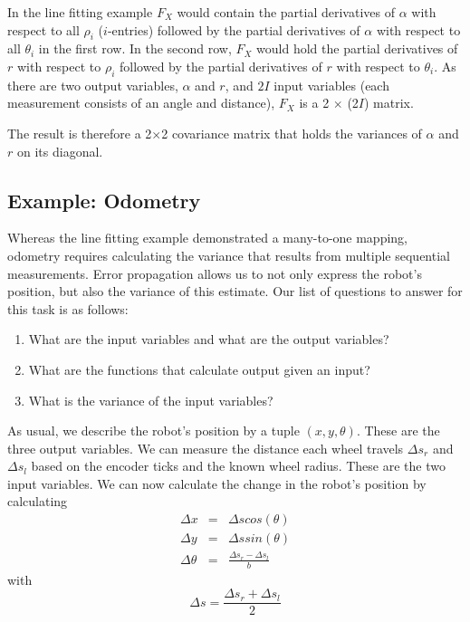 In the line fitting example $ F_X$ would contain the partial derivatives of $ \alpha$ with respect to all $ \rho_i$ ($i$-entries) followed by the partial derivatives of $ \alpha$ with respect to all $ \theta_i$ in the first row. In the second row, $ F_X$ would hold the partial derivatives of $ r$ with respect to $ \rho_i$ followed by the partial derivatives of $ r$ with respect to $ \theta_i$. As there are two output variables, $ \alpha$ and $ r$, and $2I$ input variables (each measurement consists of an angle and distance), $ F_X$ is a 2 $\times$ (2$I$) matrix.

The result is therefore a 2$\times$2 covariance matrix that holds the variances of $ \alpha$ and $ r$ on its diagonal.

\subsection{Example: Odometry}
Whereas the line fitting example demonstrated a many-to-one mapping, odometry requires calculating the variance that results from multiple sequential measurements.  Error propagation allows us to not only express the robot's position, but also the variance of this estimate. Our list of questions to answer for this task is as follows:
\begin{enumerate}
\item What are the input variables and what are the output variables?
\item What are the functions that calculate output given an input?
\item What is the variance of the input variables?
\end{enumerate}

As usual, we describe the robot's position by a tuple $ (x,y,\theta)$. These are the three output variables. We can measure the distance each wheel travels $ \Delta s_r$ and $ \Delta s_l$ based on the encoder ticks and the known wheel radius. These are the two input variables. We can now calculate the change in the robot's position by calculating
\begin{eqnarray}
\Delta x  &=& \Delta s cos(\theta)\\
\Delta y  &=& \Delta s sin(\theta)\\
\Delta \theta &=& \frac{\Delta s_r-\Delta s_l}{b}
\end{eqnarray}
with
\begin{equation}
\Delta s=\frac{\Delta s_r + \Delta s_l}{2}
\end{equation}

